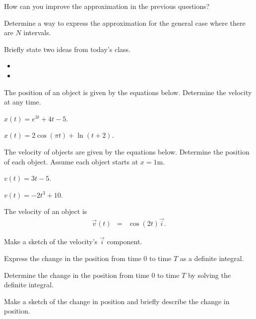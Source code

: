 \begin{problem}
\begin{subproblem}
        \vfill

  \end{subproblem}
  \clearpage

\item How can you improve the approximation in the previous questions?
  \vspace{3em}

\item Determine a way to express the approximation for the general
  case where there are $N$ intervals.

  \vfill

\end{problem}

\postClass

\begin{problem}
\item Briefly state two ideas from today's class.
  \begin{itemize}
  \item
  \item
  \end{itemize}
\item The position of an object is given by the equations
  below. Determine the velocity at any time.
  \begin{subproblem}
  \item $x(t) = e^{3t} + 4t  - 5$.
    \vfill
  \item $x(t) = 2\cos(\pi t) + \ln(t+2)$.
    \vfill
  \end{subproblem}
\item The velocity of objects are given by the equations
  below. Determine the position of each object. Assume each object
  starts at $x=1$m.
  \begin{subproblem}
  \item $v(t) = 3t - 5$.
    \vfill
  \item $v(t) = -2 t^3 + 10$.
    \vfill
  \end{subproblem}
\clearpage
\item The velocity of an object is
  \begin{eqnarray*}
    \vec{v}(t) & = & \cos(2t) \vec{i}.
  \end{eqnarray*}
  \begin{subproblem}
  \item Make a sketch of the velocity's $\vec{i}$ component.
    \vfill
  \item Express the change in the position from time 0 to time $T$ as
    a definite integral.
    \vfill
  \item Determine the change in the position from time 0 to time $T$
    by solving the definite integral.
    \vfill
  \item Make a sketch of the change in position and briefly describe
    the change in position.
    \vfill
  \end{subproblem}
  \clearpage


\end{problem}
